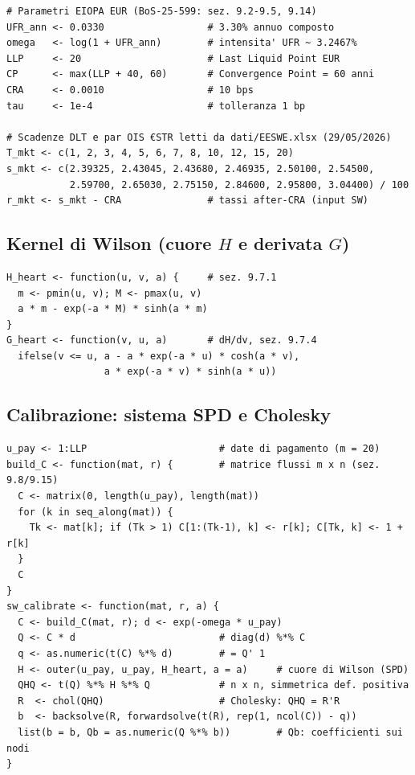 \documentclass[11pt,a4paper]{article}
\theoremstyle{plain}
\theoremstyle{definition}
\theoremstyle{remark}
\newcommand{\bfb}{\mathbf{b}}
\newcommand{\bfp}{\mathbf{p}}
\newcommand{\bfq}{\mathbf{q}}
\newcommand{\Hmat}{\mathbf{H}}
\newcommand{\Cmat}{\mathbf{C}}
\newcommand{\Qmat}{\mathbf{Q}}
\newcommand{\transp}{^{\mskip-1mu\top}}
\begin{document}
\begin{codebox}
\begin{Verbatim}[fontsize=\small]
# Parametri EIOPA EUR (BoS-25-599: sez. 9.2-9.5, 9.14)
UFR_ann <- 0.0330                  # 3.30% annuo composto
omega   <- log(1 + UFR_ann)        # intensita' UFR ~ 3.2467%
LLP     <- 20                      # Last Liquid Point EUR
CP      <- max(LLP + 40, 60)       # Convergence Point = 60 anni
CRA     <- 0.0010                  # 10 bps
tau     <- 1e-4                    # tolleranza 1 bp

# Scadenze DLT e par OIS €STR letti da dati/EESWE.xlsx (29/05/2026)
T_mkt <- c(1, 2, 3, 4, 5, 6, 7, 8, 10, 12, 15, 20)
s_mkt <- c(2.39325, 2.43045, 2.43680, 2.46935, 2.50100, 2.54500,
           2.59700, 2.65030, 2.75150, 2.84600, 2.95800, 3.04400) / 100
r_mkt <- s_mkt - CRA               # tassi after-CRA (input SW)
\end{Verbatim}
\end{codebox}

\subsection{Kernel di Wilson (cuore $H$ e derivata $G$)}

\begin{codebox}
\begin{Verbatim}[fontsize=\small]
H_heart <- function(u, v, a) {     # sez. 9.7.1
  m <- pmin(u, v); M <- pmax(u, v)
  a * m - exp(-a * M) * sinh(a * m)
}
G_heart <- function(v, u, a)       # dH/dv, sez. 9.7.4
  ifelse(v <= u, a - a * exp(-a * u) * cosh(a * v),
                 a * exp(-a * v) * sinh(a * u))
\end{Verbatim}
\end{codebox}

\subsection{Calibrazione: sistema SPD e Cholesky}

\begin{codebox}[Costruzione di $\Cmat,\Qmat$ e soluzione di $\Qmat\transp\Hmat\Qmat\,\bfb=\bfp-\bfq$]
\begin{Verbatim}[fontsize=\small]
u_pay <- 1:LLP                       # date di pagamento (m = 20)
build_C <- function(mat, r) {        # matrice flussi m x n (sez. 9.8/9.15)
  C <- matrix(0, length(u_pay), length(mat))
  for (k in seq_along(mat)) {
    Tk <- mat[k]; if (Tk > 1) C[1:(Tk-1), k] <- r[k]; C[Tk, k] <- 1 + r[k]
  }
  C
}
sw_calibrate <- function(mat, r, a) {
  C <- build_C(mat, r); d <- exp(-omega * u_pay)
  Q <- C * d                         # diag(d) %*% C
  q <- as.numeric(t(C) %*% d)        # = Q' 1
  H <- outer(u_pay, u_pay, H_heart, a = a)     # cuore di Wilson (SPD)
  QHQ <- t(Q) %*% H %*% Q            # n x n, simmetrica def. positiva
  R  <- chol(QHQ)                    # Cholesky: QHQ = R'R
  b  <- backsolve(R, forwardsolve(t(R), rep(1, ncol(C)) - q))
  list(b = b, Qb = as.numeric(Q %*% b))        # Qb: coefficienti sui nodi
}
\end{Verbatim}
\end{codebox}
\end{document}
